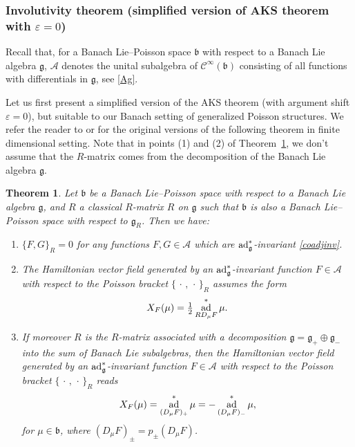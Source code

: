 \documentclass[a4paper,12pt,reqno]{amsart}%
\newtheorem{theorem}{Theorem}
\theoremstyle{definition}
\theoremstyle{remark}
\numberwithin{theorem}{section}
\numberwithin{equation}{section}
\newcommand{\1}{{\bf 1}}
\newcommand{\pb}{\{\,\cdot\,,\,\cdot\,\}}
\DeclareMathOperator{\ad}{\textnormal{ad}}
\newcommand{\Cp}{\mathscr{C}}
\newcommand{\g}{{\mathfrak g}}
\newcommand{\bg}{{\mathfrak b}}
\begin{document}
\subsubsection{Involutivity theorem (simplified version of AKS theorem with $\varepsilon =0$)}\label{epsilon0}
Recall that, for a Banach Lie--Poisson space $\bg$ with respect to a Banach Lie algebra $\g$, $\mathcal{A}$ denotes the unital subalgebra of $\Cp^{\infty}(\bg)$ consisting of all  functions with differentials in $\g$, see \eqref{Ag}.

Let us first present a simplified version of the AKS theorem (with argument shift $\varepsilon = 0$), but suitable to our Banach setting of generalized Poisson structures. We refer the reader to \cite[Theorem 1]{semenov83} or \cite[Theorem 4.36]{adler} for the original versions of the following theorem in finite dimensional setting. Note that in points (1) and (2) of Theorem~\ref{AKS}, we don't assume that the $R$-matrix comes from the decomposition of the Banach Lie algebra $\g$.


\begin{theorem}\label{AKS}
    Let $\bg$ be a Banach Lie--Poisson space with respect to a Banach Lie algebra  $\g$, and $R$ a classical $R$-matrix $R$ on $\g$ such that $\bg$ is also a Banach Lie--Poisson space with respect to $\g_R$.
       Then we have:
    \begin{enumerate}
    \item $\{F,G\}_R = 0$ for any functions $F,G\in \mathcal{A}$ which are $\ad^*_\g$-invariant \eqref{coadjinv}.
    \item The Hamiltonian vector field generated by an $\ad^*_\g$-invariant function $F\in\mathcal A$ with respect to the Poisson bracket $\pb_R$ assumes the form
    \[X_F(\mu) = \tfrac12 \ad^*_{R D_\mu F }\mu.\]
    \item If moreover  $R$ is the $R$-matrix associated with a decomposition $\g = \g_+\oplus \g_-$ into the sum of Banach Lie subalgebras, then the Hamiltonian vector field generated by an $\ad^*_\g$-invariant function $F\in \mathcal{A}$  with respect to the Poisson bracket $\pb_R$  reads
    \begin{equation}\label{hamvec}
    X_F(\mu) = \ad^*_{(D_\mu F)_+}\mu = - \ad^*_{(D_\mu F)_-}\mu, 
    \end{equation}
    for $\mu \in \bg$, where $(D_\mu F)_\pm = p_\pm(D_\mu F)$.
\end{enumerate}
\end{theorem}
\end{document}
